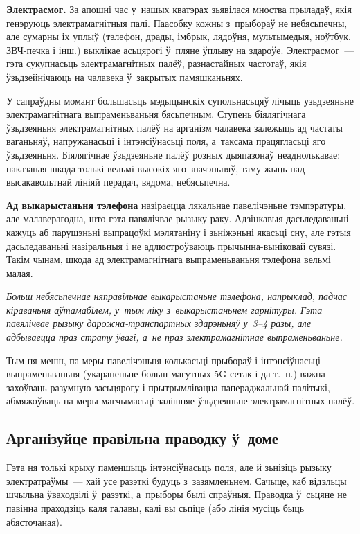\textbf{Электрасмог.} За апошні час у~нашых кватэрах зьявілася мноства прыладаў, якія генэруюць электрамагнітныя палі. Паасобку кожны з~прыбораў не небясьпечны, але сумарны іх уплыў (тэлефон, драды, імбрык, лядоўня, мультымедыя, ноўтбук, ЗВЧ-печка і інш.) выклікае асьцярогі ў~пляне ўплыву на здароўе. Электрасмог~--- гэта сукупнасьць электрамагнітных палёў, разнастайных частотаў, якія ўзьдзейнічаюць на чалавека ў~закрытых памяшканьнях.

У сапраўдны момант большасьць мэдыцынскіх супольнасьцяў лічыць узьдзеяньне электрамагнітнага выпраменьваньня бясьпечным. Ступень біялягічнага ўзьдзеяньня электрамагнітных палёў на арганізм чалавека залежыць ад частаты ваганьняў, напружанасьці і інтэнсіўнасьці поля, а~таксама працягласьці яго ўзьдзеяньня. Біялягічнае ўзьдзеяньне палёў розных дыяпазонаў неаднолькавае: паказаная шкода толькі вельмі высокіх яго значэньняў, таму жыць пад высакавольтнай лініяй перадач, вядома, небясьпечна.

\textbf{Ад выкарыстаньня тэлефона} назіраецца лякальнае павелічэньне тэмпэратуры, але малаверагодна, што гэта павялічвае рызыку раку. Адзінкавыя дасьледаваньні кажуць аб парушэньні выпрацоўкі мэлятаніну і зьніжэньні якасьці сну, але гэтыя дасьледаваньні назіральныя і не адлюстроўваюць прычынна-выніковай сувязі. Такім чынам, шкода ад электрамагнітнага выпраменьваньня тэлефона вельмі малая. 

\emph{Больш небясьпечнае няправільнае выкарыстаньне тэлефона, напрыклад, падчас кіраваньня аўтамабілем, у~тым ліку з~выкарыстаньнем гарнітуры. Гэта павялічвае рызыку дарожна-транспартных здарэньняў у~3--4 разы, але адбываецца праз страту ўвагі, а~не праз электрамагнітнае выпраменьваньне.}

Тым ня менш, па меры павелічэньня колькасьці прыбораў і інтэнсіўнасьці выпраменьваньня (укараненьне больш магутных 5G сетак і да т.~п.) важна захоўваць разумную засьцярогу і прытрымлівацца папераджальнай палітыкі, абмяжоўваць па меры магчымасьці залішняе ўзьдзеяньне электрамагнітных палёў.

\subsection*{Арганізуйце правільна праводку ў~доме}

Гэта ня толькі крыху паменшыць інтэнсіўнасьць поля, але й зьнізіць рызыку электратраўмы~--- хай усе разэткі будуць з~зазямленьнем. Сачыце, каб відэльцы шчыльна ўваходзілі ў~разэткі, а~прыборы былі спраўныя. Праводка ў~сьцяне не павінна праходзіць каля галавы, калі вы сьпіце (або лінія мусіць быць абясточаная).

